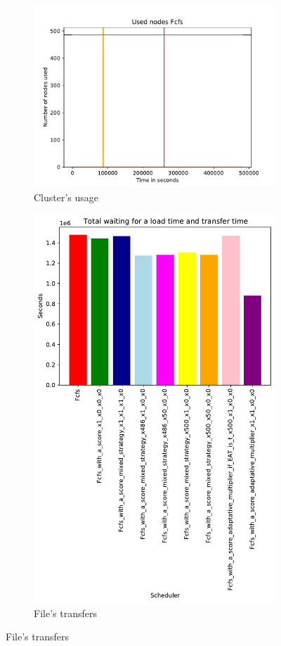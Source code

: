 \documentclass[a4paper]{article}
\begin{document}
\begin{figure}[H]\centering
\begin{subfigure}[b]{0.4\linewidth}\centering\includegraphics[width=1\linewidth]{MBSS/plot/2022-05-21->2022-05-22_V9532_Fcfs_Used_nodes_450_128_32_256_4_1024.pdf}\caption{Cluster's usage}\end{subfigure}
\begin{subfigure}[b]{0.4\linewidth}\centering\includegraphics[width=0.9\linewidth]{MBSS/plot/Results_FCFS_Score_Adaptative_Multiplier_2022-05-21->2022-05-22_V9271_Total_waiting_for_a_load_time_and_transfer_time_450_128_32_256_4_1024.pdf}\caption{File's transfers}\end{subfigure}

\end{figure}
\end{document}
